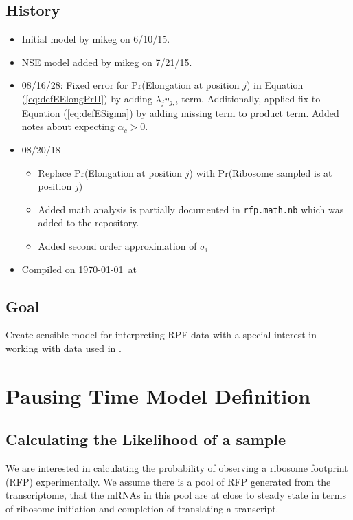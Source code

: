 \documentclass{article}
\newcommand{\alphac}{\ensuremath{{\alpha_c}}\xspace}
\begin{document}
\subsection*{History}
\begin{itemize}
\item Initial model  by mikeg on 6/10/15.
\item NSE model added by mikeg on 7/21/15.
\item 08/16/28: Fixed error for Pr(Elongation at position $j$) in Equation (\ref{eq:defEElongPrII}) by adding $\lambda_j v_{g,i}$ term.
  Additionally, applied fix to Equation (\ref{eq:defESigma}) by adding missing term to product term.
Added notes about expecting $\alphac > 0$.
\item 08/20/18
  \begin{itemize}
  \item Replace Pr(Elongation at position $j$) with Pr(Ribosome sampled is at position $j$)
  \item Added math analysis is partially documented in \texttt{rfp.math.nb} which was added to the repository.
  \item Added second order approximation of $\sigma_i$
  \end{itemize}
\item Compiled on \today \ at \ \currenttime
 \end{itemize}
\subsection*{Goal}
\label{goal}
Create sensible model for interpreting RPF data with a special interest in working with data used in \citet{PopEtAl2014}.

\section*{Pausing Time Model Definition}
\subsection*{Calculating the Likelihood of a sample}
We are interested in calculating the probability of observing a ribosome footprint (RFP) experimentally.
We assume there is a pool of RFP generated from the transcriptome, that the mRNAs in this pool are at close to steady state in terms of ribosome initiation and completion of translating a transcript.
\end{document}
